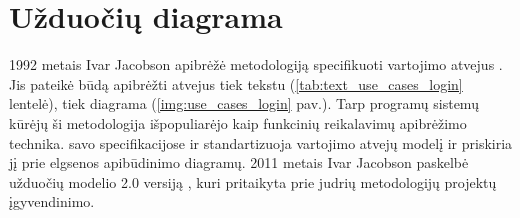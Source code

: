 \section{Užduočių diagrama}

1992 metais Ivar Jacobson apibrėžė metodologiją specifikuoti vartojimo atvejus \cite{Jacobson1992}. Jis pateikė būdą apibrėžti atvejus tiek tekstu (\ref{tab:text_use_cases_login} lentelė), tiek diagrama (\ref{img:use_cases_login} pav.). Tarp programų sistemų kūrėjų ši metodologija išpopuliarėjo kaip funkcinių reikalavimų apibrėžimo technika. \OMG savo specifikacijose \UML \cite{omgUmlFormal} ir \SysML \cite{OMGSysML} standartizuoja vartojimo atvejų modelį ir priskiria jį prie elgsenos apibūdinimo diagramų. 2011 metais Ivar Jacobson paskelbė užduočių modelio 2.0 versiją \cite{jacobson2011usecase}, kuri pritaikyta prie judrių metodologijų projektų įgyvendinimo.

